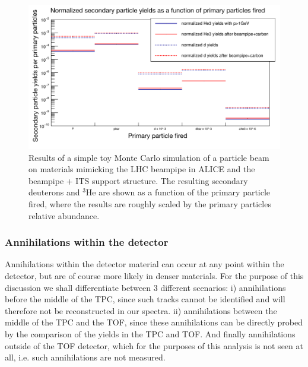 \begin{figure}
    \centering
    \includegraphics[width=\textwidth]{figures/simpleMC_secondaries_G4.png}
    \caption{Results of a simple toy Monte Carlo simulation of a particle beam on materials mimicking the LHC beampipe in ALICE and the beampipe + ITS support structure. The resulting secondary deuterons and $^3\mathrm{He}$ are shown as a function of the primary particle fired, where the results are roughly scaled by the primary particles relative abundance.}
    \label{fig:toyMCGeant4Spallation}
\end{figure}
\subsubsection{Annihilations within the detector}
Annihilations within the detector material can occur at any point within the detector, but are of course more likely in denser materials. For the purpose of this discussion we shall differentiate between 3 different scenarios: i) annihilations before the middle of the TPC, since such tracks cannot be identified and will therefore not be reconstructed in our spectra. ii) annihilations between the middle of the TPC and the TOF, since these annihilations can be directly probed by the comparison of the yields in the TPC and TOF. And finally annihilations outside of the TOF detector, which for the purposes of this analysis is not seen at all, i.e. such annihilations are not measured. \\

